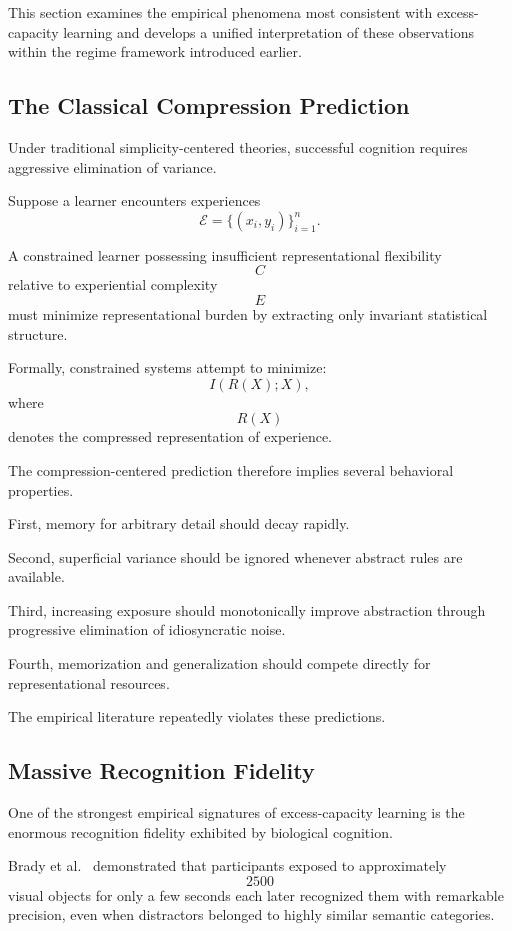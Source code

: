 \documentclass[12pt,a4paper]{article}
\begin{document}
This section examines the empirical phenomena most consistent with excess-capacity learning and develops a unified interpretation of these observations within the regime framework introduced earlier.

\subsection{The Classical Compression Prediction}

Under traditional simplicity-centered theories, successful cognition requires aggressive elimination of variance.

Suppose a learner encounters experiences
\[
\mathcal{E}
=
\{
(x_i,y_i)
\}_{i=1}^n.
\]

A constrained learner possessing insufficient representational flexibility
\[
C
\]
relative to experiential complexity
\[
E
\]
must minimize representational burden by extracting only invariant statistical structure.

Formally, constrained systems attempt to minimize:
\[
I(R(X);X),
\]
where
\[
R(X)
\]
denotes the compressed representation of experience.

The compression-centered prediction therefore implies several behavioral properties.

First, memory for arbitrary detail should decay rapidly.

Second, superficial variance should be ignored whenever abstract rules are available.

Third, increasing exposure should monotonically improve abstraction through progressive elimination of idiosyncratic noise.

Fourth, memorization and generalization should compete directly for representational resources.

The empirical literature repeatedly violates these predictions.

\subsection{Massive Recognition Fidelity}

One of the strongest empirical signatures of excess-capacity learning is the enormous recognition fidelity exhibited by biological cognition.

Brady et al.\ \cite{Brady2008} demonstrated that participants exposed to approximately
\[
2500
\]
visual objects for only a few seconds each later recognized them with remarkable precision, even when distractors belonged to highly similar semantic categories.
\end{document}

